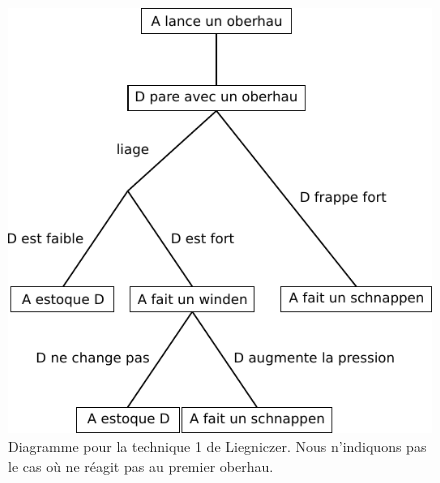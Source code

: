 \begin{figure}[htp]
	\centering
	\includegraphics{diagrammes/epee_bocle/liegniczer_1}
	\caption{Diagramme pour la technique 1 de Liegniczer.
	Nous n'indiquons pas le cas où \D ne réagit pas au premier oberhau.}
	\label{épée-bocle:fig:liegniczer:diagramme-1}
\end{figure}



